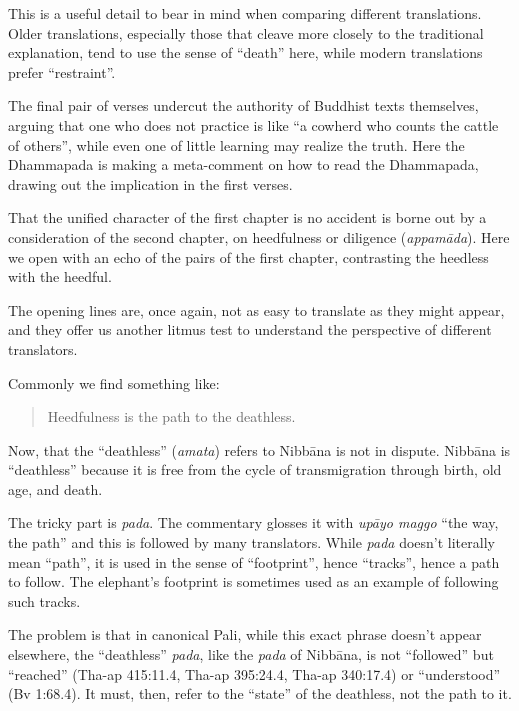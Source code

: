 \documentclass[12pt,openany]{book}%
\begin{document}
This is a useful detail to bear in mind when comparing different translations. Older translations, especially those that cleave more closely to the traditional explanation, tend to use the sense of “death” here, while modern translations prefer “restraint”.

The final pair of verses undercut the authority of Buddhist texts themselves, arguing that one who does not practice is like “a cowherd who counts the cattle of others”, while even one of little learning may realize the truth. Here the Dhammapada is making a meta-comment on how to read the Dhammapada, drawing out the implication in the first verses.

That the unified character of the first chapter is no accident is borne out by a consideration of the second chapter, on heedfulness or diligence (\textit{\textsanskrit{appamāda}}). Here we open with an echo of the pairs of the first chapter, contrasting the heedless with the heedful.

The opening lines are, once again, not as easy to translate as they might appear, and they offer us another litmus test to understand the perspective of different translators.

Commonly we find something like:

\begin{verse}%
Heedfulness is the path to the deathless.

%
\end{verse}

Now, that the “deathless” (\textit{amata}) refers to \textsanskrit{Nibbāna} is not in dispute. \textsanskrit{Nibbāna} is “deathless” because it is free from the cycle of transmigration through birth, old age, and death.

The tricky part is \textit{pada}. The commentary glosses it with \textit{\textsanskrit{upāyo} maggo} “the way, the path” and this is followed by many translators. While \textit{pada} doesn’t literally mean “path”, it is used in the sense of “footprint”, hence “tracks”, hence a path to follow. The elephant’s footprint is sometimes used as an example of following such tracks.

The problem is that in canonical Pali, while this exact phrase doesn’t appear elsewhere, the “deathless” \textit{pada}, like the \textit{pada} of \textsanskrit{Nibbāna}, is not “followed” but “reached” (Tha-ap 415:11.4, Tha-ap 395:24.4, Tha-ap 340:17.4) or “understood” (Bv 1:68.4). It must, then, refer to the “state” of the deathless, not the path to it.
\end{document}
